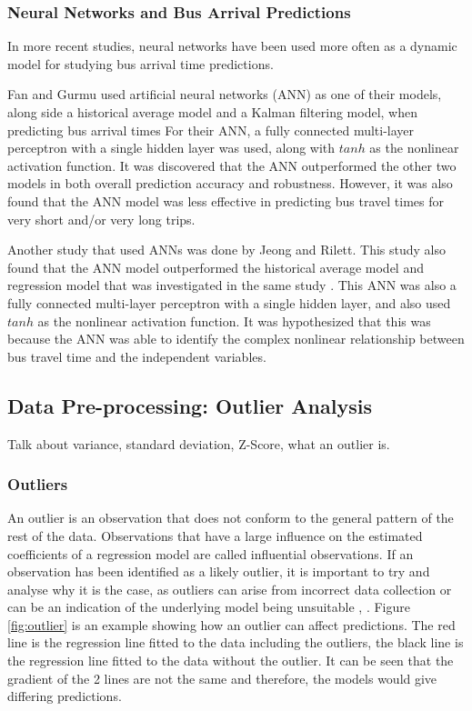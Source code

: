 \subsubsection{Neural Networks and Bus Arrival Predictions}

In more recent studies, neural networks have been used more often as a dynamic model for studying bus arrival time predictions. 

Fan and Gurmu used artificial neural networks (ANN) as one of their models, along side a historical average model and a Kalman filtering model, when predicting bus arrival times \cite{dynamic-gps}  For their ANN, a fully connected multi-layer perceptron with a single hidden layer was used, along with $tanh$ as the nonlinear activation function. It was discovered that the ANN outperformed the other two models in both overall prediction accuracy and robustness. However, it was also found that the ANN model was less effective in predicting bus travel times for very short and/or very long trips.

Another study that used ANNs was done by Jeong and Rilett. This study also found that the ANN model outperformed the historical average model and regression model that was investigated in the same study \cite{ann-prediction}. This ANN was also a fully connected multi-layer perceptron with a single hidden layer, and also used $tanh$ as the nonlinear activation function. It was hypothesized that this was because the ANN was able to identify the complex nonlinear relationship between bus travel time and the independent variables. 

\subsection{Data Pre-processing: Outlier Analysis}

Talk about variance, standard deviation, Z-Score, what an outlier is.

\subsubsection{Outliers}

An outlier is an observation that does not conform to the general pattern of the rest of the data. Observations that have a large influence on the estimated coefficients of a regression model are called influential observations. If an observation has been identified as a likely outlier, it is important to try and analyse why it is the case, as outliers can arise from incorrect data collection or can be an indication of the underlying model being unsuitable \cite{forecasting-book}, \cite{m2s2-notes}. Figure \ref{fig:outlier} is an example showing how an outlier can affect predictions. The red line is the regression line fitted to the data including the outliers, the black line is the regression line fitted to the data without the outlier. It can be seen that the gradient of the 2 lines are not the same and therefore, the models would give differing predictions.  

